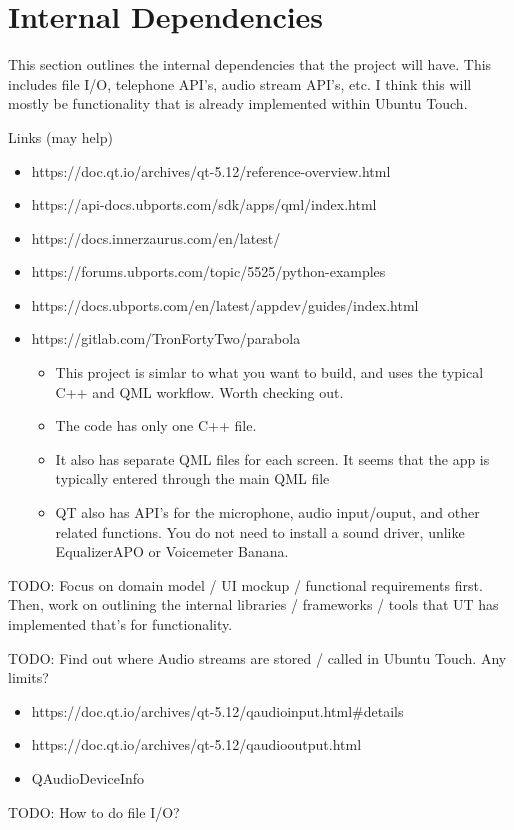 \section{Internal Dependencies}

This section outlines the internal dependencies that the project will have. This includes file I/O, telephone API's, audio stream API's, etc. I think this will mostly be functionality that is already implemented within Ubuntu Touch.

Links (may help)
\begin{itemize}
	\item https://doc.qt.io/archives/qt-5.12/reference-overview.html
	\item https://api-docs.ubports.com/sdk/apps/qml/index.html
	\item https://docs.innerzaurus.com/en/latest/
	\item https://forums.ubports.com/topic/5525/python-examples
	\item https://docs.ubports.com/en/latest/appdev/guides/index.html
	\item https://gitlab.com/TronFortyTwo/parabola
	\begin{itemize}
		\item This project is simlar to what you want to build, and uses the typical C++ and QML workflow. Worth checking out.
		\item The code has only one C++ file.
		\item It also has separate QML files for each screen. It seems that the app is typically entered through the main QML file
		\item QT also has API's for the microphone, audio input/ouput, and other related functions. You do not need to install a sound driver, unlike EqualizerAPO or Voicemeter Banana.
	\end{itemize}
\end{itemize}


TODO: Focus on domain model / UI mockup / functional requirements first. Then, work on outlining the internal libraries / frameworks / tools that UT has implemented that's for functionality.

TODO: Find out where Audio streams are stored / called in Ubuntu Touch. Any limits?
\begin{itemize}
	\item https://doc.qt.io/archives/qt-5.12/qaudioinput.html\#details
	\item https://doc.qt.io/archives/qt-5.12/qaudiooutput.html
	\item QAudioDeviceInfo 
\end{itemize}


TODO: How to do file I/O?


